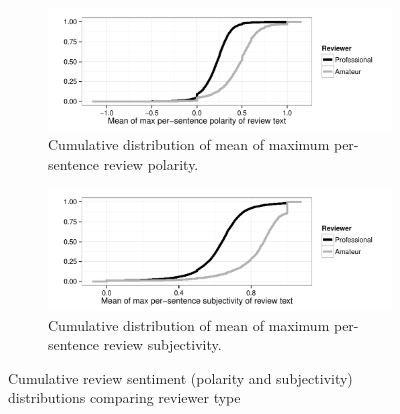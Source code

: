 \documentclass[letterpaper]{article}
\begin{document}
\begin{figure}[tb]
\centering

\begin{subfigure}[b]{\linewidth}
\includegraphics[width=\linewidth]{./console_games_polmaxmean_ecdf}
\caption{Cumulative distribution of mean of maximum per-sentence review polarity.}
\label{fig:revpol_max}
\end{subfigure}

\begin{subfigure}[b]{\linewidth}
\includegraphics[width=\linewidth]{./console_games_subjmaxmean_ecdf}
\caption{Cumulative distribution of mean of maximum per-sentence review subjectivity.}
\label{fig:revsubj_max}
\end{subfigure}
\caption{Cumulative review sentiment (polarity and subjectivity) distributions comparing reviewer type}
\label{fig:revsubj_density}
\end{figure}
\end{document}
